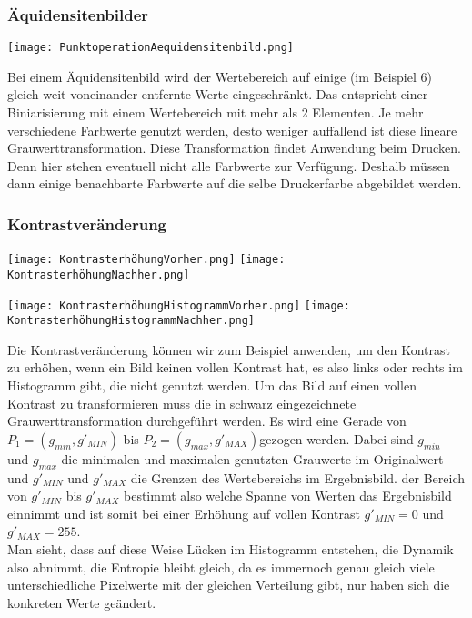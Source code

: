 \subsubsection{Äquidensitenbilder}

\texttt{[image: PunktoperationAequidensitenbild.png]}

Bei einem Äquidensitenbild wird der Wertebereich auf einige (im Beispiel 6) gleich weit voneinander entfernte Werte eingeschränkt. Das entspricht einer Biniarisierung mit einem Wertebereich mit mehr als 2 Elementen. Je mehr verschiedene Farbwerte genutzt werden, desto weniger auffallend ist diese lineare Grauwerttransformation. Diese Transformation findet Anwendung beim Drucken. Denn hier stehen eventuell nicht alle Farbwerte zur Verfügung. Deshalb müssen dann einige benachbarte Farbwerte auf die selbe Druckerfarbe abgebildet werden.

\subsubsection{Kontrastveränderung}

\texttt{[image: KontrasterhöhungVorher.png]} \hspace{200px}
\texttt{[image: KontrasterhöhungNachher.png]}

\texttt{[image: KontrasterhöhungHistogrammVorher.png]}
\hspace{150px}
\texttt{[image: KontrasterhöhungHistogrammNachher.png]}

Die Kontrastveränderung können wir zum Beispiel anwenden, um den Kontrast zu erhöhen, wenn ein Bild keinen vollen Kontrast hat, es also links oder rechts im Histogramm gibt, die nicht genutzt werden. Um das Bild auf einen vollen Kontrast zu transformieren muss die in schwarz eingezeichnete Grauwerttransformation durchgeführt werden. Es wird eine Gerade von $P_1=(g_{min}, g'_{MIN})$ bis $P_2=(g_{max}, g'_{MAX})$gezogen werden. Dabei sind $g_{min}$ und $g_{max}$ die minimalen und maximalen genutzten Grauwerte im Originalwert und $g'_{MIN}$ und  $g'_{MAX}$ die Grenzen des Wertebereichs im Ergebnisbild. der Bereich von $g'_{MIN}$ bis $g'_{MAX}$ bestimmt also welche Spanne von Werten das Ergebnisbild einnimmt und ist somit bei einer Erhöhung auf vollen Kontrast $g'_{MIN}=0$ und $g'_{MAX}=255$.\\
Man sieht, dass auf diese Weise Lücken im Histogramm entstehen, die Dynamik also abnimmt, die Entropie bleibt gleich, da es immernoch genau gleich viele unterschiedliche Pixelwerte mit der gleichen Verteilung gibt, nur haben sich die konkreten Werte geändert.\\

